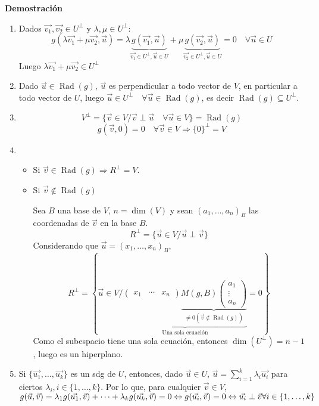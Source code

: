 \documentclass[x11names,table]{report}
\DeclareMathOperator{\rad}{Rad}
\begin{document}
\textbf{Demostración}
\begin{enumerate}

\item Dados $\vec{v_1},\vec{v_2}\in U^\perp$ y $\lambda,\mu\in U^\perp$:
\[
g(\lambda\vec{v_1}+\mu \vec{v_2},\vec{u})=\lambda \underbrace{g(\vec{v_1},\vec{u})}_{\vec{v_1}\in U^\perp,\vec{u}\in U}+\mu \underbrace{g(\vec{v_2},\vec{u})}_{\vec{v_2}\in U^\perp, \vec{u}\in U}=0\quad\forall\vec{u}\in U\]
Luego $\lambda\vec{v_1}+\mu \vec{v_2}\in U^\perp$

\item Dado $\vec{u}\in\rad(g)$, $\vec{u}$ es perpendicular a todo vector de $V$, en particular a todo vector de $U$, luego $\vec{u}\in U^\perp\quad\forall\vec{u}\in\rad(g)$, es decir  $\rad(g)\subseteq U^\perp$.
\item \[V^\perp=\{\vec{v}\in V/\vec{v}\perp\vec{u}\quad\forall\vec{u}\in V\}=\rad(g)\]
\[g(\vec{v},0)=0\quad\forall\vec{v}\in V\Rightarrow\{0\}^\perp=V\]
\item
\begin{itemize}
\item Si $\vec{v}\in\rad(g)\Rightarrow R^\perp=V$.
\item Si $\vec{v}\not\in\rad(g)$

Sea $B$ una base de $V$, $n=\dim(V)$ y sean $(a_1,\dots,a_n)_B$ las coordenadas de $\vec{v}$ en la base $B$.
\[R^\perp=\{\vec{u}\in V/\vec{u}\perp\vec{v}\}\]
Considerando que $\vec{u}=(x_1,\dots,x_n)_B$,
\[R^\perp=\left\lbrace \vec{u}\in V/\underbrace{\begin{pmatrix}
x_1 & \cdots & x_n
\end{pmatrix}\underbrace{M(g,B)\begin{pmatrix}
a_1 \\ \vdots \\ a_n
\end{pmatrix}}_{\not=0(\vec{v}\not\in\rad(g))}}_{\text{Una sola ecuación}}=0\right\rbrace \]
Como el subespacio tiene una sola ecuación, entonces $\dim(U^\perp)=n-1$, luego es un hiperplano.
\end{itemize}
\item Si $\{\vec{u_1},\dots,\vec{u_k}\}$ es un sdg de $U$, entonces, dado $\vec{u}\in U$, $\vec{u}=\sum_{i=1}^k \lambda_i\vec{u_i}$ para ciertos $\lambda_i, i\in\{1,\dots,k\}$. Por lo que, para cualquier $\vec{v}\in V$,\linebreak $g(\vec{u},\vec{v})=\lambda_1 g(\vec{u_1},\vec{v})+\cdots +\lambda_k g(\vec{u_k},\vec{v})=0\Leftrightarrow g(\vec{u_i},\vec{v})=0\Leftrightarrow\vec{u_i}\perp\vec{v}\linebreak\forall i\in\{1,\dots,k\}$

\end{enumerate}
\end{document}
